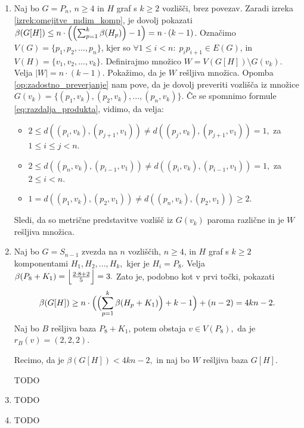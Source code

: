\documentclass[mat1, tisk]{fmfdelo}
\newcommand{\1}{(1, 1, ..., 1)}
\newcommand{\2}{(2, 2, ..., 2)}
\begin{document}
    \begin{dokaz}
        \begin{enumerate}
            \item Naj bo $G = P_n$, $n\geq 4$ in $H$ graf s $k\geq 2$ vozlišči, brez povezav. 
            Zaradi izreka \ref{izrek:omejitve_mdim_komp}, je dovolj pokazati 
            $\beta(G[H]) \leq n \cdot \Bigl ( \Bigl ( \sum_{p=1}^{k} \beta(H_p) \Bigr )  - 1  \Bigr ) = n 
            \cdot (k - 1)$. Označimo $V(G) = \{p_1 , p_2, ..., p_n\}$, kjer so $\forall 1 \leq i < n : \; 
            p_i p_{i+1} \in E(G)$, in $V(H) = \{ v_1, v_2, ..., v_k\}.$ Definirajmo množico 
            $W = V(G[H]) \setminus G(v_k).$ Velja $|W| = n \cdot (k-1).$ 
            Pokažimo, da je $W$ rešljiva množica. Opomba \ref{op:zadostno_preverjanje} nam pove, da je dovolj preveriti
            vozlišča iz množice $G(v_k) = \{ (p_1, v_k), (p_2, v_k), ..., (p_n, v_k)\}$. Če se spomnimo formule
            \ref{eq:razdalja_produkta}, vidimo, da velja:
            \begin{itemize}
                \item $2 \leq d((p_i, v_k), (p_{j+1}, v_1)) \neq d((p_j, v_k), (p_{j + 1}, v_1)) = 1,$ 
                za $ 1 \leq i \leq j < n $.
                \item $2 \leq d((p_n, v_k), (p_{i-1}, v_1)) \neq d((p_i, v_k), (p_{i- 1}, v_1)) = 1,$ 
                za $ 2 \leq i < n $.
                \item $1 = d((p_1, v_k), (p_2, v_1)) \neq d((p_n, v_k), (p_2, v_1)) \geq 2.$
            \end{itemize}
            Sledi, da so metrične predstavitve vozlišč iz $G(v_k)$ paroma različne in je $W$ rešljiva množica.
    
            \item Naj bo $G = S_{n-1}$ zvezda na $n$ vozliščih, $n\geq 4$, in $H$ graf s $k \geq 2$ komponentami
            $H_1, H_2, ..., H_k,$ kjer je $H_i = P_8.$ Velja $\beta(P_8 + K_1) = 
            \Bigl \lfloor \frac{2\cdot 8 + 2}{5} \Bigr \rfloor = 3. $ %
            Zato je, podobno kot v prvi točki, pokazati  
            $$\beta(G[H]) \geq n \cdot \Bigl ( \Bigl ( \sum_{p=1}^{k} \beta(H_p + K_1) \Bigr ) + k - 1 \Bigr ) + 
            (n-2) = 4kn - 2.$$ 
            Naj bo $B$ rešljiva baza $P_8 + K_1$, potem obstaja $v \in V(P_8),$ da je $r_B(v) = (2, 2, 2).$
    
            Recimo, da je $\beta(G[H]) < 4kn - 2,$ in naj bo $W$ rešljiva baza $G[H]$. 
            
            TODO
    
            \item TODO
            \item TODO
    
        \end{enumerate}
    \end{dokaz}
\end{document}
